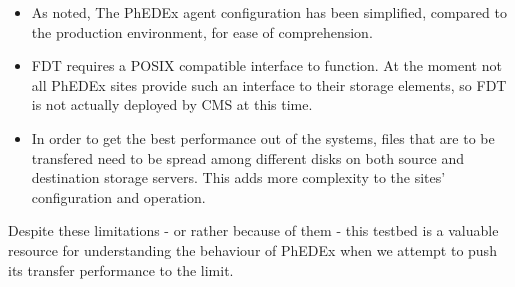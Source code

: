 \begin{itemize}
  \item As noted, The PhEDEx agent configuration has been simplified, compared to the production environment, for ease of comprehension.
	\item FDT requires a POSIX compatible interface to function. At the moment
not all PhEDEx sites provide such an interface to their storage elements, so FDT is not actually deployed by CMS at this time.
	\item In order to get the best performance out of the systems, files that
are to be transfered need to be spread among different disks on both source
and destination storage servers. This adds more complexity to the sites'
configuration and operation.
\end{itemize}

Despite these limitations - or rather because of them - this testbed is a valuable resource for understanding the behaviour of PhEDEx when we attempt to push its transfer performance to the limit.